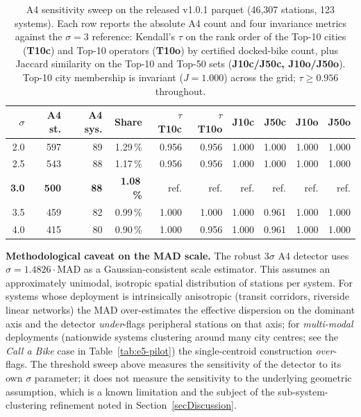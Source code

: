 \documentclass[11pt,a4paper]{article}
\begin{document}
\begin{table}[!htbp]
\centering
\caption{A4 sensitivity sweep on the released v1.0.1 parquet
(46{,}307 stations, 123 systems). Each row reports the absolute
A4 count and four invariance metrics against the $\sigma = 3$
reference: Kendall's $\tau$ on the rank order of the Top-10 cities
(\textbf{T10c}) and Top-10 operators (\textbf{T10o}) by certified
docked-bike count, plus Jaccard similarity on the Top-10 and
Top-50 sets (\textbf{J10c/J50c, J10o/J50o}). Top-10 city
membership is invariant ($J = 1.000$) across the grid;
$\tau \geq 0.956$ throughout.}
\label{tab:a4-sigma-sweep}
\small
\begin{tabular}{@{}rrrrrrrrrr@{}}
\toprule
\textbf{$\sigma$} & \textbf{A4 st.} & \textbf{A4 sys.} & \textbf{Share}
 & \textbf{$\tau$ T10c} & \textbf{$\tau$ T10o}
 & \textbf{J10c} & \textbf{J50c} & \textbf{J10o} & \textbf{J50o}\\
\midrule
2.0 & 597 & 89 & 1.29\,\% & 0.956 & 0.956 & 1.000 & 1.000 & 1.000 & 1.000 \\
2.5 & 543 & 88 & 1.17\,\% & 0.956 & 0.956 & 1.000 & 1.000 & 1.000 & 1.000 \\
\textbf{3.0} & \textbf{500} & \textbf{88} & \textbf{1.08\,\%} & ref. & ref. & ref. & ref. & ref. & ref. \\
3.5 & 459 & 82 & 0.99\,\% & 1.000 & 1.000 & 1.000 & 0.961 & 1.000 & 1.000 \\
4.0 & 415 & 80 & 0.90\,\% & 1.000 & 0.956 & 1.000 & 0.961 & 1.000 & 1.000 \\
\bottomrule
\end{tabular}

\medskip
{\footnotesize \textbf{Methodological caveat on the MAD scale.}
The robust $3\sigma$ A4 detector uses
$\hat\sigma = 1.4826 \cdot \mathrm{MAD}$ as a Gaussian-consistent
scale estimator. This assumes an approximately unimodal,
isotropic spatial distribution of stations per system. For
systems whose deployment is intrinsically anisotropic (transit
corridors, riverside linear networks) the MAD over-estimates the
effective dispersion on the dominant axis and the detector
\emph{under}-flags peripheral stations on that axis; for
\emph{multi-modal} deployments (nationwide systems clustering
around many city centres; see the \emph{Call a Bike} case in
Table~\ref{tab:e5-pilot}) the single-centroid construction
\emph{over}-flags. The threshold sweep above measures the
sensitivity of the detector to its own $\sigma$ parameter; it
does not measure the sensitivity to the underlying geometric
assumption, which is a known limitation and the subject of the
sub-system-clustering refinement noted in
Section~\ref{secDiscussion}.}
\end{table}
\end{document}

